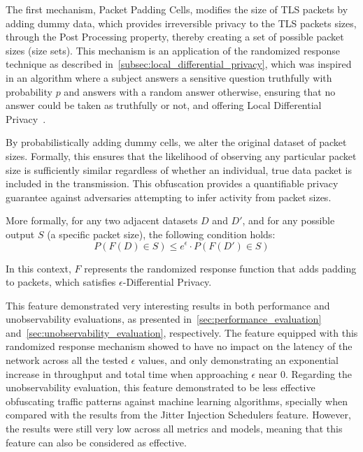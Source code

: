 The first mechanism, Packet Padding Cells, modifies the size of TLS packets by adding dummy data, which provides irreversible privacy to the TLS packets sizes, through the Post Processing property, thereby creating a set of possible packet sizes (size sets).
This mechanism is an application of the randomized response technique as described in~\autoref{subsec:local_differential_privacy}, which was inspired in an algorithm where a subject answers a sensitive question truthfully with probability $p$ and answers with a random answer otherwise, ensuring that no answer could be taken as truthfully or not, and offering Local Differential Privacy~\cite{RandomizedResponse, AlgFoundationsDP}.

By probabilistically adding dummy cells, we alter the original dataset of packet sizes. Formally, this ensures that the likelihood of observing any particular packet size is sufficiently similar regardless of whether an individual, true data packet is included in the transmission. This obfuscation provides a quantifiable privacy guarantee against adversaries attempting to infer activity from packet sizes.

More formally, for any two adjacent datasets $D$ and $D'$, and for any possible output $S$ (a specific packet size), the following condition holds:
\[P(F(D) \in S) \leq e^{\epsilon} \cdot P(F(D') \in S)\]

In this context, $F$ represents the randomized response function that adds padding to packets, which satisfies $\epsilon$-Differential Privacy. 

This feature demonstrated very interesting results in both performance and unobservability evaluations, as presented in~\autoref{sec:performance_evaluation} and~\autoref{sec:unobservability_evaluation}, respectively. The feature equipped with this randomized response mechanism showed to have no impact on the latency of the network across all the tested $\epsilon$ values, and only demonstrating an exponential increase in throughput and total time when approaching $\epsilon$ near 0. Regarding the unobservability evaluation, this feature demonstrated to be less effective obfuscating traffic patterns against machine learning algorithms, specially when compared with the results from the Jitter Injection Schedulers feature. However, the results were still very low across all metrics and models, meaning that this feature can also be considered as effective.

